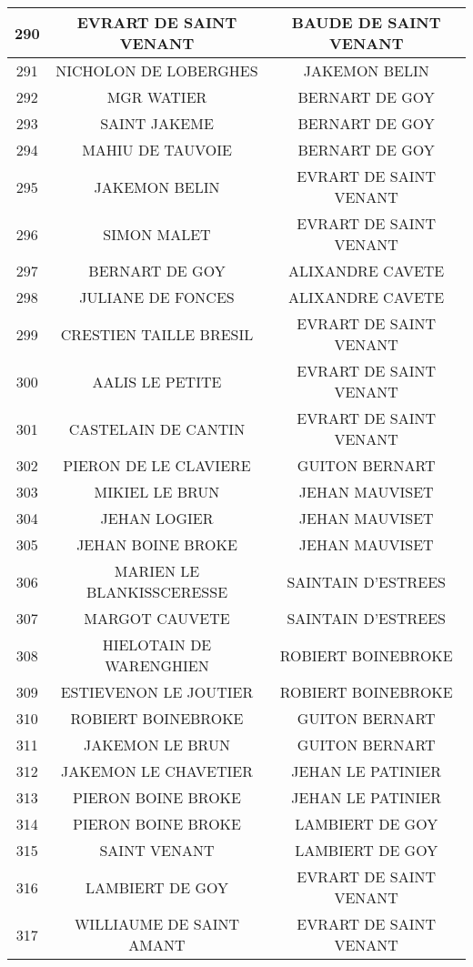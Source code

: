 \begin{center}
\begin{longtable}{|c|c|c|}
\hline	290	&	EVRART DE SAINT VENANT	&	BAUDE DE SAINT VENANT	\\
\hline	291	&	NICHOLON DE LOBERGHES	&	JAKEMON BELIN	\\
\hline	292	&	MGR WATIER	&	BERNART DE GOY	\\
\hline	293	&	SAINT JAKEME	&	BERNART DE GOY	\\
\hline	294	&	MAHIU DE TAUVOIE	&	BERNART DE GOY	\\
\hline	295	&	JAKEMON BELIN	&	EVRART DE SAINT VENANT	\\
\hline	296	&	SIMON MALET	&	EVRART DE SAINT VENANT	\\
\hline	297	&	BERNART DE GOY	&	ALIXANDRE CAVETE	\\
\hline	298	&	JULIANE DE FONCES	&	ALIXANDRE CAVETE	\\
\hline	299	&	CRESTIEN TAILLE BRESIL	&	EVRART DE SAINT VENANT	\\
\hline	300	&	AALIS LE PETITE	&	EVRART DE SAINT VENANT	\\
\hline	301	&	CASTELAIN DE CANTIN	&	EVRART DE SAINT VENANT	\\
\hline	302	&	PIERON DE LE CLAVIERE	&	GUITON BERNART	\\
\hline	303	&	MIKIEL LE BRUN	&	JEHAN MAUVISET	\\
\hline	304	&	JEHAN LOGIER	&	JEHAN MAUVISET	\\
\hline	305	&	JEHAN BOINE BROKE	&	JEHAN MAUVISET	\\
\hline	306	&	MARIEN LE BLANKISSCERESSE	&	SAINTAIN D'ESTREES	\\
\hline	307	&	MARGOT CAUVETE	&	SAINTAIN D'ESTREES	\\
\hline	308	&	HIELOTAIN DE WARENGHIEN	&	ROBIERT BOINEBROKE	\\
\hline	309	&	ESTIEVENON LE JOUTIER	&	ROBIERT BOINEBROKE	\\
\hline	310	&	ROBIERT BOINEBROKE	&	GUITON BERNART	\\
\hline	311	&	JAKEMON LE BRUN	&	GUITON BERNART	\\
\hline	312	&	JAKEMON LE CHAVETIER	&	JEHAN LE PATINIER	\\
\hline	313	&	PIERON BOINE BROKE	&	JEHAN LE PATINIER	\\
\hline	314	&	PIERON BOINE BROKE	&	LAMBIERT DE GOY	\\
\hline	315	&	SAINT VENANT	&	LAMBIERT DE GOY	\\
\hline	316	&	LAMBIERT DE GOY	&	EVRART DE SAINT VENANT	\\
\hline	317	&	WILLIAUME DE SAINT AMANT	&	EVRART DE SAINT VENANT	\\

\end{longtable}
\end{center}
